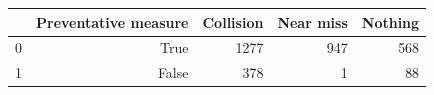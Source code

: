 \begin{tabular}{lrrrr}
\toprule
 & Preventative measure & Collision & Near miss & Nothing \\
\midrule
0 & True & 1277 & 947 & 568 \\
1 & False & 378 & 1 & 88 \\
\bottomrule
\end{tabular}
